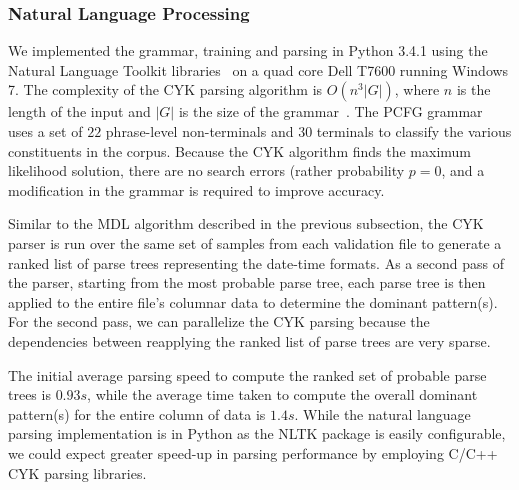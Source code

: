 \subsubsection{Natural Language Processing}
We implemented the grammar, training and parsing in Python 3.4.1 using the Natural Language Toolkit libraries~\cite{nltk} on a quad core Dell T7600 running Windows 7. The complexity of the CYK parsing algorithm is $O(n^{3}|G|)$, where $n$ is the length of the input and $|G|$ is the size of the grammar~\cite{Younger67}. The PCFG grammar uses a set of $22$ phrase-level non-terminals and $30$ terminals to classify the various constituents in the corpus. Because the CYK algorithm finds the maximum likelihood solution, there are no search errors (rather probability $p = 0$, and a modification in the grammar is required to improve accuracy.

Similar to the MDL algorithm described in the previous subsection, the CYK parser is run over the same set of samples from each validation file to generate a ranked list of parse trees representing the date-time formats. As a second pass of the parser, starting from the most probable parse tree, each parse tree is then applied to the entire file's columnar data to determine the dominant pattern(s). For the second pass, we can parallelize the CYK parsing because the dependencies between reapplying the ranked list of parse trees are very sparse.

The initial average parsing speed to compute the ranked set of probable parse trees is $0.93s$, while the average time taken to compute the overall dominant pattern(s) for the entire column of data is $1.4s$. While the natural language parsing implementation is in Python as the NLTK package is easily configurable, we could expect greater speed-up in parsing performance by employing C/C++ CYK parsing libraries.

